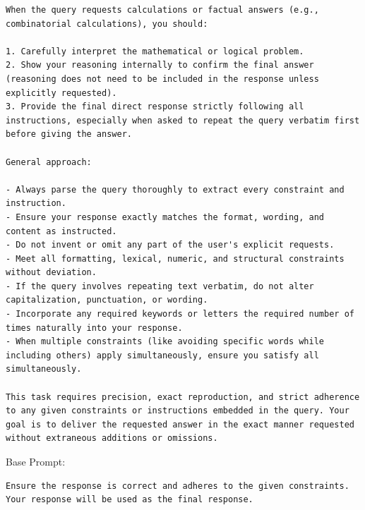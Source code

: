 \begin{instructbox}
\begin{lstlisting}[breakindent=0pt, breaklines=true, breakatwhitespace=true, frame=single, backgroundcolor=\color{blue!10}]
When the query requests calculations or factual answers (e.g., combinatorial calculations), you should:

1. Carefully interpret the mathematical or logical problem.
2. Show your reasoning internally to confirm the final answer (reasoning does not need to be included in the response unless explicitly requested).
3. Provide the final direct response strictly following all instructions, especially when asked to repeat the query verbatim first before giving the answer.

General approach:

- Always parse the query thoroughly to extract every constraint and instruction.
- Ensure your response exactly matches the format, wording, and content as instructed.
- Do not invent or omit any part of the user's explicit requests.
- Meet all formatting, lexical, numeric, and structural constraints without deviation.
- If the query involves repeating text verbatim, do not alter capitalization, punctuation, or wording.
- Incorporate any required keywords or letters the required number of times naturally into your response.
- When multiple constraints (like avoiding specific words while including others) apply simultaneously, ensure you satisfy all simultaneously.

This task requires precision, exact reproduction, and strict adherence to any given constraints or instructions embedded in the query. Your goal is to deliver the requested answer in the exact manner requested without extraneous additions or omissions.
\end{lstlisting}
\end{instructbox}\begin{instructbox}
Base Prompt:
\begin{lstlisting}[breakindent=0pt, breaklines=true, breakatwhitespace=true, frame=single, backgroundcolor=\color{gray!10}]
Ensure the response is correct and adheres to the given constraints. Your response will be used as the final response.
\end{lstlisting}


\end{instructbox}
